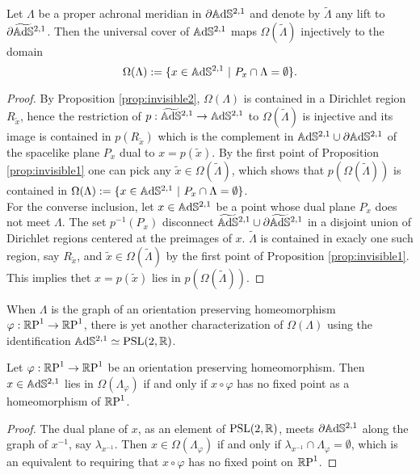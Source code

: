\begin{proposition}\label{prop:invisible in ads}
    Let $\Lambda$ be a proper achronal meridian in $\partial\A^{2,1}$ and denote by $\widetilde{\Lambda}$ any lift to $\partial\AS^{2,1}$. Then the universal cover of $\A^{2,1}$ maps $\Omega(\widetilde{\Lambda})$ injectively to the domain
    \[
        \Omega(\Lambda) := \{ x\in \A^{2,1} \ | \ P_x \cap \Lambda = \emptyset \}.
    \]
\end{proposition}
\begin{proof}
    By Proposition \ref{prop:invisible2}, $\Omega(\Lambda)$ is contained in a Dirichlet region $R_{\widetilde{x}}$, hence the restriction of $p : \AS^{2,1} \to \A^{2,1}$ to $\Omega(\widetilde{\Lambda})$ is injective and its image is contained in $p(R_{\widetilde{x}})$ which is the complement in $\A^{2,1} \cup \partial\A^{2,1}$ of the spacelike plane $P_x$ dual to $x=p(\widetilde{x})$. By the first point of Proposition \ref{prop:invisible1} one can pick any $\widetilde{x} \in \Omega(\widetilde{\Lambda})$, which shows that $p(\Omega(\widetilde{\Lambda}))$ is contained in $\Omega(\Lambda) := \{ x\in \A^{2,1} \ | \ P_x \cap \Lambda = \emptyset \}$.\\
    For the converse inclusion, let $x \in \A^{2,1}$ be a point whose dual plane $P_x$ does not meet $\Lambda$. The set $p^{-1}(P_x)$ disconnect $\AS^{2,1} \cup \partial\AS^{2,1}$ in a disjoint union of Dirichlet regions centered at the preimages of $x$. $\widetilde{\Lambda}$ is contained in exacly one such region, say $R_{\widetilde{x}}$, and $\widetilde{x} \in \Omega(\widetilde{\Lambda})$ by the first point of Proposition \ref{prop:invisible1}. This implies thet $x = p(\widetilde{x})$ lies in $p(\Omega(\widetilde{\Lambda}))$.
\end{proof}
When $\Lambda$ is the graph of an orientation preserving homeomorphism $\varphi : \S \to \S$, there is yet another characterization of $\Omega(\Lambda)$ using the identification $\A^{2,1} \simeq \PSL$.
\begin{corollary}\label{cor:invisible in ads}
    Let $\varphi :\S\to\S$ be an orientation preserving homeomorphism. Then $x\in \A^{2,1}$ lies in $\Omega(\Lambda_\varphi)$ if and only if $x \circ \varphi$ has no fixed point as a homeomorphism of $\S$.
\end{corollary}
\begin{proof}
    The dual plane of $x$, as an element of $\PSL$, meets $\partial\A^{2,1}$ along the graph of $x^{-1}$, say $\lambda_{x^{-1}}$. Then $x \in \Omega(\Lambda_\varphi)$ if and only if $\lambda_{x^{-1}} \cap \Lambda_\varphi = \emptyset$, which is an equivalent to requiring that $x \circ \varphi$ has no fixed point on $\S$.
\end{proof}

